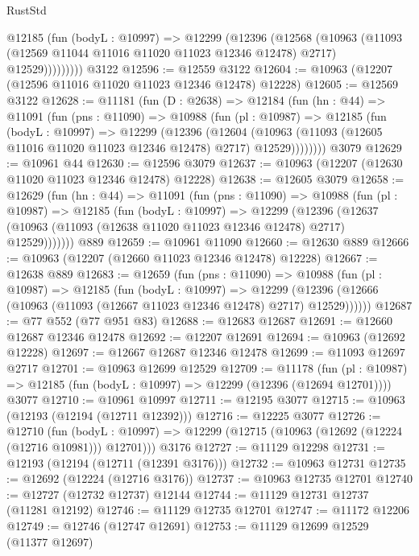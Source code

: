 \begin{lexlean}{RustStd}
\begin{coremodule}
            @12185
              (fun (bodyL : @10997) =>
              @12299
                (@12396
                  (@12568
                    (@10963
                      (@11093 (@12569 @11044 @11016 @11020 @11023 @12346 @12478) @2717)
                      @12529)))))))))
    @3122
@12596 := @12559 @3122
@12604 := @10963 (@12207 (@12596 @11016 @11020 @11023 @12346 @12478) @12228)
@12605 := @12569 @3122
@12628 := @11181
    (fun (D : @2638) =>
    @12184
      (fun (hn : @44) =>
      @11091
        (fun (pns : @11090) =>
        @10988
          (fun (pl : @10987) =>
          @12185
            (fun (bodyL : @10997) =>
            @12299
              (@12396
                (@12604
                  (@10963 (@11093 (@12605 @11016 @11020 @11023 @12346 @12478) @2717) @12529))))))))
    @3079
@12629 := @10961 @44
@12630 := @12596 @3079
@12637 := @10963 (@12207 (@12630 @11020 @11023 @12346 @12478) @12228)
@12638 := @12605 @3079
@12658 := @12629
    (fun (hn : @44) =>
    @11091
      (fun (pns : @11090) =>
      @10988
        (fun (pl : @10987) =>
        @12185
          (fun (bodyL : @10997) =>
          @12299
            (@12396
              (@12637 (@10963 (@11093 (@12638 @11020 @11023 @12346 @12478) @2717) @12529)))))))
    @889
@12659 := @10961 @11090
@12660 := @12630 @889
@12666 := @10963 (@12207 (@12660 @11023 @12346 @12478) @12228)
@12667 := @12638 @889
@12683 := @12659
    (fun (pns : @11090) =>
    @10988
      (fun (pl : @10987) =>
      @12185
        (fun (bodyL : @10997) =>
        @12299 (@12396 (@12666 (@10963 (@11093 (@12667 @11023 @12346 @12478) @2717) @12529))))))
@12687 := @77 @552 (@77 @951 @83)
@12688 := @12683 @12687
@12691 := @12660 @12687 @12346 @12478
@12692 := @12207 @12691
@12694 := @10963 (@12692 @12228)
@12697 := @12667 @12687 @12346 @12478
@12699 := @11093 @12697 @2717
@12701 := @10963 @12699 @12529
@12709 := @11178
    (fun (pl : @10987) => @12185 (fun (bodyL : @10997) => @12299 (@12396 (@12694 @12701))))
    @3077
@12710 := @10961 @10997
@12711 := @12195 @3077
@12715 := @10963 (@12193 (@12194 (@12711 @12392)))
@12716 := @12225 @3077
@12726 := @12710
    (fun (bodyL : @10997) => @12299 (@12715 (@10963 (@12692 (@12224 (@12716 @10981))) @12701)))
    @3176
@12727 := @11129 @12298
@12731 := @12193 (@12194 (@12711 (@12391 @3176)))
@12732 := @10963 @12731
@12735 := @12692 (@12224 (@12716 @3176))
@12737 := @10963 @12735 @12701
@12740 := @12727 (@12732 @12737) @12144
@12744 := @11129 @12731 @12737 (@11281 @12192)
@12746 := @11129 @12735 @12701
@12747 := @11172 @12206
@12749 := @12746 (@12747 @12691)
@12753 := @11129 @12699 @12529 (@11377 @12697)

\end{coremodule}
\end{lexlean}
